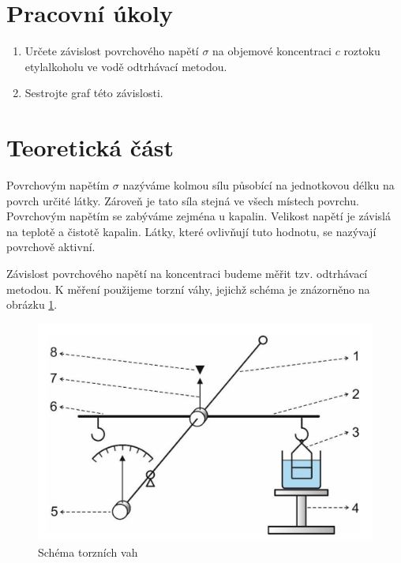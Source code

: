 \section{Pracovní úkoly}

\begin{enumerate}
\item Určete závislost povrchového napětí \(\sigma\) na objemové koncentraci \(c\) roztoku etylalkoholu ve vodě odtrhávací metodou.

\item Sestrojte graf této závislosti.

\end{enumerate}

\section{Teoretická část}

Povrchovým napětím \(\sigma\) nazýváme kolmou sílu působící na jednotkovou délku na povrch určité látky. Zároveň je tato síla stejná ve všech místech povrchu. Povrchovým napětím se zabýváme zejména u kapalin. Velikost napětí je závislá na teplotě a čistotě kapalin. Látky, které ovlivňují tuto hodnotu, se nazývají povrchově aktivní.

Závislost povrchového napětí na koncentraci budeme měřit tzv. odtrhávací metodou. K měření použijeme torzní váhy, jejichž schéma je znázorněno na obrázku \ref{fig:torzni-vahy}.

\begin{figure}[h]
    \centering
    \includegraphics[width=0.5\linewidth]{4 - Závislost povrchového napětí na koncentraci povrchově aktivní látky//Protokol_povrchové napětí//img/Schéma torzních vah.png}
    \caption{Schéma torzních vah}
    \label{fig:torzni-vahy}
\end{figure}

